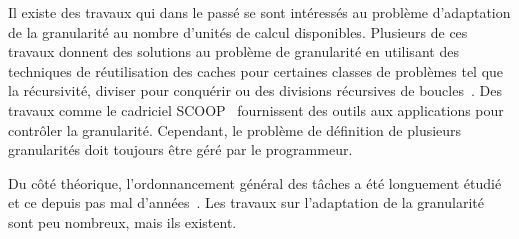 Il existe des travaux qui dans le passé se sont intéressés au problème d'adaptation de la granularité au nombre d'unités de calcul disponibles.
%
Plusieurs de ces travaux donnent des solutions au problème de granularité en utilisant des techniques de réutilisation des caches pour certaines classes de problèmes tel que la récursivité, diviser pour conquérir ou des divisions récursives de boucles~\cite{unifieddataflow,Intel::TBB,Cilk,xkaapi,taskscomparison}.
%
Des travaux comme le cadriciel SCOOP~\cite{scoopp} fournissent des outils aux applications pour contrôler la granularité.
%
Cependant, le problème de définition de plusieurs granularités doit toujours être géré par le programmeur.


Du côté théorique, l'ordonnancement général des tâches a été longuement étudié et ce depuis pas mal d'années~\cite{Khan94acomparison,heft}.
%
Les travaux sur l'adaptation de la granularité sont peu nombreux, mais ils existent.

